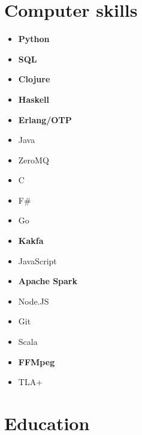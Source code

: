 \documentclass[11pt,a4paper,roman,english]{moderncv}        %
\begin{document}


\makecvtitle
\section{Computer skills}
\begin{multicols}{4}
	\begin{itemize}
		\item[] \textbf{Python}
		\item[] \textbf{SQL}
		\item[] \textbf{Clojure}
		\item[] \textbf{Haskell}
		\item[] \textbf{Erlang/OTP}
		\item[] Java
		\item[] ZeroMQ
		\item[] C
		\item[] F\#
		\item[] Go
		\item[] \textbf{Kakfa}
		\item[] JavaScript
		\item[] \textbf{Apache Spark}
		\item[] Node.JS
		\item[] Git
		\item[] Scala
		\item[] \textbf{FFMpeg}
        \item[] TLA+
	\end{itemize}
\end{multicols}
\section{Education}
\end{document}
